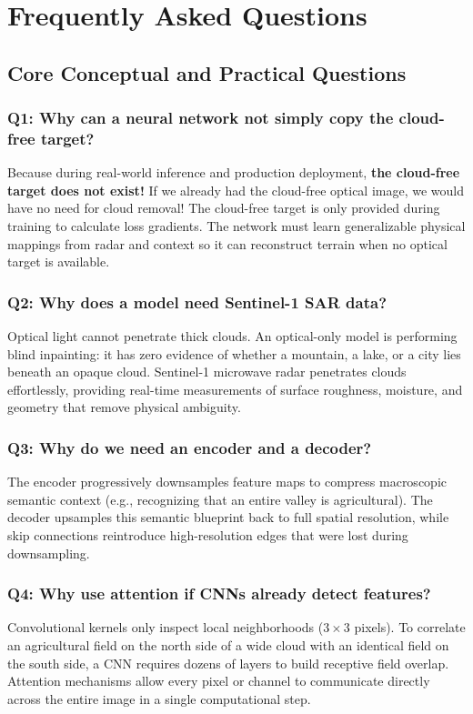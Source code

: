 \chapter{Frequently Asked Questions}
\label{chap:ch23}

\section{Core Conceptual and Practical Questions}

\subsection*{Q1: Why can a neural network not simply copy the cloud-free target?}
Because during real-world inference and production deployment, \textbf{the cloud-free target does not exist!} If we already had the cloud-free optical image, we would have no need for cloud removal! The cloud-free target is only provided during training to calculate loss gradients. The network must learn generalizable physical mappings from radar and context so it can reconstruct terrain when no optical target is available.

\subsection*{Q2: Why does a model need Sentinel-1 SAR data?}
Optical light cannot penetrate thick clouds. An optical-only model is performing blind inpainting: it has zero evidence of whether a mountain, a lake, or a city lies beneath an opaque cloud. Sentinel-1 microwave radar penetrates clouds effortlessly, providing real-time measurements of surface roughness, moisture, and geometry that remove physical ambiguity.

\subsection*{Q3: Why do we need an encoder and a decoder?}
The encoder progressively downsamples feature maps to compress macroscopic semantic context (e.g., recognizing that an entire valley is agricultural). The decoder upsamples this semantic blueprint back to full spatial resolution, while skip connections reintroduce high-resolution edges that were lost during downsampling.

\subsection*{Q4: Why use attention if CNNs already detect features?}
Convolutional kernels only inspect local neighborhoods ($3 \times 3$ pixels). To correlate an agricultural field on the north side of a wide cloud with an identical field on the south side, a CNN requires dozens of layers to build receptive field overlap. Attention mechanisms allow every pixel or channel to communicate directly across the entire image in a single computational step.

